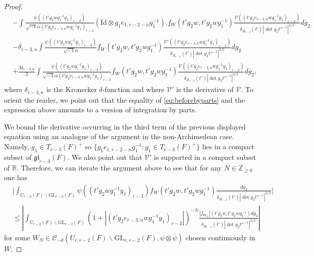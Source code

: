 \documentclass[12pt]{amsart}
\theoremstyle{remark}
\numberwithin{equation}{section}
\newcommand{\GL}{\mathrm{GL}}
\newcommand{\ZZ}{\mathbb{Z}}
\newcommand{\RR}{\mathbb{R}}
\theoremstyle{definition}
\numberwithin{equation}{subsection}
\begin{document}
\begin{proof}
\begin{align*}
    &-\int  \frac{\psi((t'g_2wg_1^{-1}y_1)_{r-3})}{\sqrt{-1}\alpha(t'g_2e_{r-3,n} wg_1^{-1}y_1)_{r-3}}(\mathrm{Id}\otimes g_1e_{1,r-2-n}g_1^{-1}).f_{W}(t'g_2w,t'g_2wg_1^{-1})\frac{\mathcal{V}((t'g_2e_{r-3,n} wg_1^{-1}y_1)_{r-3})}{\delta_{B_{r-3}}(t')|\det g_2t''^{-1}|^{3/2}}d\dot{g_2}\\
    &-\delta_{r-3,n}\int \frac{\psi((t'g_2wg_1^{-1}y_1)_{r-3})}{\sqrt{-1}\alpha}f_{W}(t'g_2w,t'g_2wg_1^{-1})\frac{\mathcal{V}'\left((t'g_2e_{r-3,n} wg_1^{-1}y_1)_{r-3}\right)}{\delta_{B_{r-3}}(t')|\det g_2t''^{-1}|^{3/2}}d\dot{g_2}\\
    &+\frac{3\delta_{r-3,n}}{2}\int  \frac{\psi((t'g_2wg_1^{-1}y_1)_{r-3})}{\sqrt{-1}\alpha(t'g_2e_{r-3,n}wg_1^{-1}y_1)_{r-3}}f_{W}(t'g_2w,t'g_2wg_1^{-1})\frac{\mathcal{V}\left((t'g_2e_{r-3,n} wg_1^{-1}y_1)_{r-3}\right)}{\delta_{B_{r-3}}(t')|\det g_2t''^{-1}|^{3/2}}d\dot{g_2},
\end{align*}
where $\delta_{r-3,n}$ is the Kronecker $\delta$-function and
where $\mathcal{V}'$ is the derivative of $\mathcal{V}.$
 To orient the reader, we point out that the equality of \eqref{eq:beforebyparts} and the expression above amounts to a version of integration by parts.

We bound the derivative occurring in the third term of the previous displayed equation using an analogue of the argument in the non-Archimedean case. Namely, $g_1\in T_{r-3}(F)^+$ so $\{g_1e_{1,r-2-n}g_1^{-1}:g_1\in T_{r-3}(F)^+\}$ lies in a compact subset of $\mathfrak{gl}_{r-3}(F)$.  We also point out that $\mathcal{V}'$ is supported in a compact subset of $\RR.$  Therefore, we can iterate the argument above to see that 
for any $N\in \ZZ_{\ge 0}$ one has
\begin{align*}
&\bigg|\int_{U_{r-3}(F) \backslash \GL_{r-3}(F)}\psi((t'g_2wg_1^{-1}y_1)_{r-3})f_{W}(t'g_2w,t'g_2wg_1^{-1})\frac{d\dot{g_2}}{\delta_{B_{r-3}}(t')|\det g_2t''^{-1}|^{3/2}}\bigg|\\&
\leq 
\left|\int_{U_{r-3}(F) \backslash \GL_{r-3}(F)}\left(1+|(t'g_2e_{r-3,n} wg_1^{-1}y_1)_{r-3}|\right)^{-N}\frac{|f_{W_N}|(t'g_2w,t'g_2wg_1^{-1})d\dot{g_2}}{\delta_{B_{r-3}}(t')|\det g_2t''^{-1}|^{3/2}}\right|
\end{align*}
for some $W_N \in \mathcal{C}_{-d}\left(U_{r,r-2}(F) \backslash \GL_{r,r-2}(F),\psi \otimes \overline{\psi} \right)$ chosen continuously in $W.$



\end{proof}
\end{document}
